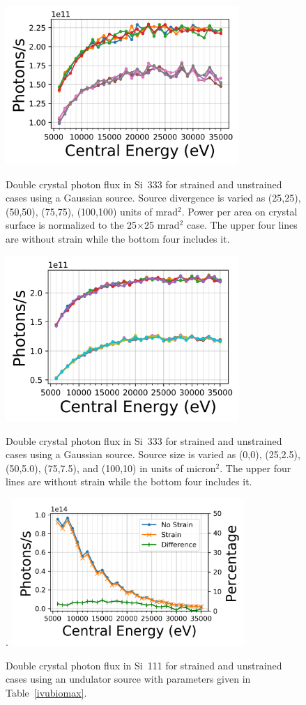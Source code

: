 \documentclass[preprint]{iucr}              %
\begin{document}
\begin{figure}
\caption{Double crystal photon flux in Si~333 for strained and unstrained cases using a Gaussian source. Source divergence is varied as (25,25), (50,50), (75,75), (100,100) units of mrad$^2$. Power per area on crystal surface is normalized to the 25$\times$25 mrad$^2$ case. The upper four lines are without strain while the bottom four includes it.}
\includegraphics[width = 8.85cm]{images/333straindivergence.png}
\label{fig:333straindivergence}
\end{figure}

\begin{figure}
\caption{Double crystal photon flux in Si~333 for strained and unstrained cases using a Gaussian source. Source size is varied as (0,0), (25,2.5), (50,5.0), (75,7.5), and (100,10) in units of micron$^2$. The upper four lines are without strain while the bottom four includes it.}
\includegraphics[width = 8.85cm]{images/333strainsize.png}
\label{fig:333strainsourcesize}
\end{figure}

\begin{figure}
\caption{Double crystal photon flux in Si~111 for strained and unstrained cases using an undulator source with parameters given in Table~\ref{ivubiomax}.}.
\includegraphics[width = 8.85cm]{images/ivu111flux.png}
\label{fig:ivu111flux}
\end{figure}
\end{document}
